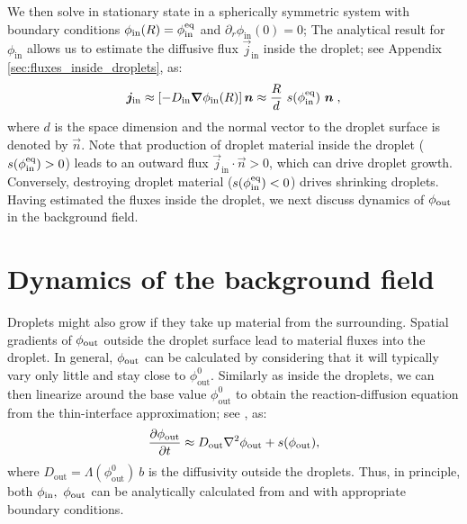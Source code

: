 We then solve  in stationary state in a spherically symmetric system with boundary conditions $\phi_\mathrm{in}(R) = \phi^\mathrm{eq}_\mathrm{in}$ and $\partial_r  \phi_\mathrm{in}(0) = 0$; 
The analytical result for $\phi_\mathrm{in}$ allows us to estimate the diffusive flux $\vec{j}_\mathrm{in}$ inside the droplet; see Appendix \ref{sec:fluxes_inside_droplets}, as:
\begin{equation}
	\label{eqn:flux_inside}
    \boldsymbol{j}_\mathrm{in}  \approx [-D_\mathrm{in} {\boldsymbol{\nabla}} \phi_\mathrm{in}(R)]\,\boldsymbol{n} \approx \frac{R}{d}~ s(\phi^\mathrm{eq}_\mathrm{in})~\boldsymbol{n}
    \;,
\end{equation}
where $d$ is the space dimension and the normal vector to the droplet surface is denoted by $\vec{n}$.
Note that production of droplet material inside the droplet ($s(\phi^\mathrm{eq}_\mathrm{in}) > 0$) leads to an outward flux $\vec{j}_\mathrm{in} \cdot \vec{n} > 0$, which can drive droplet growth.
Conversely, destroying droplet material ($s(\phi^\mathrm{eq}_\mathrm{in}) < 0$) drives shrinking droplets.
Having estimated the fluxes inside the droplet, we next discuss dynamics of $\phi_\mathrm{out}$ in the background field. 

\section{Dynamics of the background field}

Droplets might also grow if they take up material from the surrounding.
Spatial gradients of $\phi_\mathrm{out}$ outside the droplet surface lead to material fluxes into the droplet.
In general, $\phi_\mathrm{out}$ can be calculated by considering that it will typically vary only little and stay close to $\phi^0_\mathrm{out}$.
Similarly as inside the droplets, we can then linearize around the base value $\phi^0_\mathrm{out}$ to obtain the reaction-diffusion equation from the thin-interface approximation; see , as:
\begin{equation} 
	\label{eqn:RD_dilute}
	\frac{\partial \phi_\mathrm{out}}{\partial t} \approx 
	    D_\mathrm{out} \nabla ^2 \phi_\mathrm{out} + s(\phi_\mathrm{out}),
\end{equation}
where $D_\mathrm{out} = \Lambda(\phi^0_\mathrm{out})~b$ is the diffusivity outside the droplets.
Thus, in principle, both $\phi_\mathrm{in},~\phi_\mathrm{out}$ can be analytically calculated from  and  with appropriate boundary conditions.

